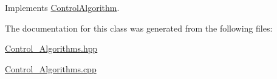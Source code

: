 Implements \hyperlink{classControlAlgorithm_ac9e2b1e3677e4ace7071c540fe035ae4}{Control\+Algorithm}.



The documentation for this class was generated from the following files\+:\begin{DoxyCompactItemize}
\item 
\hyperlink{Control__Algorithms_8hpp}{Control\+\_\+\+Algorithms.\+hpp}\item 
\hyperlink{Control__Algorithms_8cpp}{Control\+\_\+\+Algorithms.\+cpp}\end{DoxyCompactItemize}

